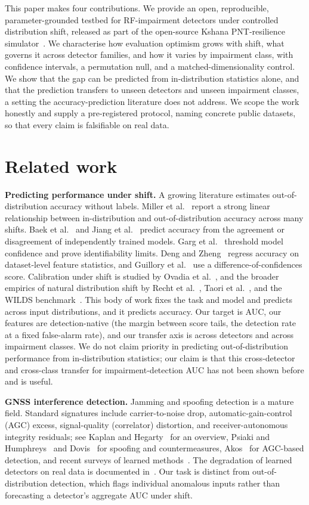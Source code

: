 \documentclass[conference]{IEEEtran}
\begin{document}
This paper makes four contributions. We provide an open, reproducible,
parameter-grounded testbed for RF-impairment detectors under controlled
distribution shift, released as part of the open-source Kshana PNT-resilience
simulator~\cite{kshana}. We characterise how evaluation optimism grows with shift, what
governs it across detector families, and how it varies by impairment class, with
confidence intervals, a permutation null, and a matched-dimensionality control. We
show that the gap can be predicted from in-distribution statistics alone, and that
the prediction transfers to unseen detectors and unseen impairment classes, a
setting the accuracy-prediction literature does not address. We scope the work
honestly and supply a pre-registered protocol, naming concrete public datasets, so
that every claim is falsifiable on real data.

\section{Related work}
\textbf{Predicting performance under shift.}
A growing literature estimates out-of-distribution accuracy without labels.
Miller et al.~\cite{aotl} report a strong linear relationship between
in-distribution and out-of-distribution accuracy across many shifts. Baek et
al.~\cite{agreement} and Jiang et al.~\cite{gde} predict accuracy from the
agreement or disagreement of independently trained models. Garg et al.~\cite{atc}
threshold model confidence and prove identifiability limits. Deng and
Zheng~\cite{denzheng} regress accuracy on dataset-level feature statistics, and
Guillory et al.~\cite{doc} use a difference-of-confidences score. Calibration under
shift is studied by Ovadia et al.~\cite{ovadia}, and the broader empirics of
natural distribution shift by Recht et al.~\cite{recht}, Taori et
al.~\cite{taori}, and the WILDS benchmark~\cite{wilds}. This body of work fixes the
task and model and predicts across input distributions, and it predicts accuracy.
Our target is AUC, our features are detection-native (the margin between score
tails, the detection rate at a fixed false-alarm rate), and our transfer axis is
across detectors and across impairment classes. We do not claim priority in
predicting out-of-distribution performance from in-distribution statistics; our
claim is that this cross-detector and cross-class transfer for impairment-detection
AUC has not been shown before and is useful.

\textbf{GNSS interference detection.}
Jamming and spoofing detection is a mature field. Standard signatures include
carrier-to-noise drop, automatic-gain-control (AGC) excess, signal-quality
(correlator) distortion, and receiver-autonomous integrity residuals; see Kaplan
and Hegarty~\cite{kaplan} for an overview, Psiaki and Humphreys~\cite{psiaki} and
Dovis~\cite{dovis} for spoofing and countermeasures, Akos~\cite{akos} for
AGC-based detection, and recent surveys of learned methods~\cite{survey}. The
degradation of learned detectors on real data is documented
in~\cite{discrepancies}. Our task is distinct from out-of-distribution detection,
which flags individual anomalous inputs rather than forecasting a detector's
aggregate AUC under shift.
\end{document}
